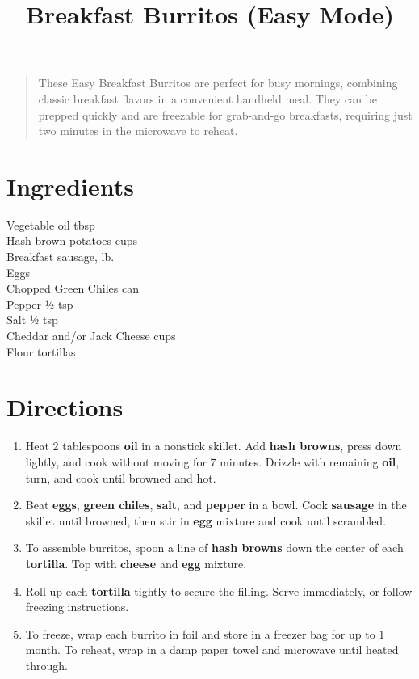 \documentclass[11pt,letterpaper]{article}
\title{Breakfast Burritos (Easy Mode)}
\author{}
\date{}
\begin{document}
\maketitle
\thispagestyle{empty}

\begin{quote}
\small
\begin{em}
These Easy Breakfast Burritos are perfect for busy mornings, combining classic breakfast flavors in a convenient handheld meal. They can be prepped quickly and are freezable for grab-and-go breakfasts, requiring just two minutes in the microwave to reheat.
\end{em}
\end{quote}

\section*{Ingredients}
\setlength{\columnsep}{20pt}
\begin{multicols}{2}
\noindent
    Vegetable oil  tbsp \\
    Hash brown potatoes  cups \\
    Breakfast sausage,  lb. \\
    Eggs  \\
    \columnbreak
    Chopped Green Chiles  can \\
    Pepper \dotfill ½ tsp \\
    Salt \dotfill ½ tsp \\
	Cheddar and/or  Jack Cheese  cups \\
    Flour tortillas  \\
\end{multicols}

\section*{Directions}

\begin{enumerate}
    \item Heat 2 tablespoons \textbf{oil} in a nonstick skillet. Add \textbf{hash browns}, press down lightly, and cook without moving for 7 minutes. Drizzle with remaining \textbf{oil}, turn, and cook until browned and hot.
    \item Beat \textbf{eggs}, \textbf{green chiles}, \textbf{salt}, and \textbf{pepper} in a bowl. Cook \textbf{sausage} in the skillet until browned, then stir in \textbf{egg} mixture and cook until scrambled.
    \item To assemble burritos, spoon a line of \textbf{hash browns} down the center of each \textbf{tortilla}. Top with \textbf{cheese} and \textbf{egg} mixture.
    \item Roll up each \textbf{tortilla} tightly to secure the filling. Serve immediately, or follow freezing instructions.
    \item To freeze, wrap each burrito in foil and store in a freezer bag for up to 1 month. To reheat, wrap in a damp paper towel and microwave until heated through.
\end{enumerate}
\end{document}
